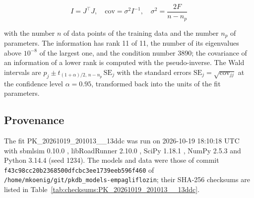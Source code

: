 \documentclass{article}
\begin{document}
\begin{equation}
I = J^\top J, \quad \mathrm{cov} = \sigma^2 I^{-1}, \quad \sigma^2 = \frac{2 F}{n - n_p}
\end{equation}

with the number $n$ of data points of the training data and the number $n_p$ of parameters. The information has rank 11 of 11, the number of its eigenvalues above $10^{-8}$ of the largest one, and the condition number 3890; the covariance of an information of a lower rank is computed with the pseudo-inverse. The Wald intervals are $\hat{p}_j \pm t_{(1+\alpha)/2,\, n-n_p}\, \mathrm{SE}_j$ with the standard errors $\mathrm{SE}_j = \sqrt{\mathrm{cov}_{jj}}$ at the confidence level $\alpha = 0.95$, transformed back into the units of the fit parameters.

\subsection{Provenance}

The fit PK\_20261019\_201013\_\_13ddc was run on 2026-10-19 18:10:18 UTC with sbmlsim 0.10.0 \cite{Koenig2026_sbmlsim}, libRoadRunner 2.10.0 \cite{Welsh2023}, SciPy 1.18.1 \cite{Virtanen2020}, NumPy 2.5.3 \cite{Harris2020} and Python 3.14.4 (seed 1234). The models and data were those of commit \texttt{f43c98cc20b2368500dfcbc3ee1739eeb596f460} of \texttt{/home/mkoenig/git/pkdb\_models-empagliflozin}; their SHA-256 checksums are listed in Table~\ref{tab:checksums:PK_20261019_201013__13ddc}.
\end{document}
